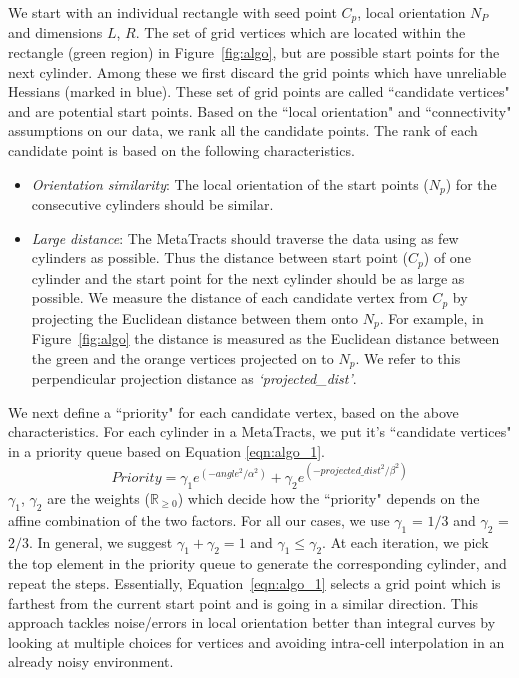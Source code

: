We start with an individual rectangle with seed point $C_{p}$, local orientation $N_P$ and dimensions $L$, $R$. The set of grid vertices which are located within the rectangle (green region) in Figure~\ref{fig:algo}, but are possible start points for the next cylinder. Among these we first discard the grid points which have unreliable Hessians (marked in blue). These set of grid points are called ``candidate vertices" and are potential start points. Based on the ``local orientation" and ``connectivity" assumptions on our data, we rank all the candidate points. The rank of each candidate point is based on the following characteristics.
\begin{itemize}[noitemsep,nolistsep]
\item \textit{Orientation similarity}: The local orientation of the start points ($N_p$) for the consecutive cylinders should be similar. 
\item \textit{Large distance}: The MetaTracts should traverse the data using as few cylinders as possible. Thus the distance between start point ($C_p$) of one cylinder and the start point for the next cylinder should be as large as possible. We measure the distance of each candidate vertex from $C_p$ by projecting the Euclidean distance between them onto $N_p$. For example, in Figure~\ref{fig:algo} the distance is measured as the Euclidean distance between the green and the orange vertices projected on to $N_p$. We refer to this perpendicular projection distance as \textit{`projected\_dist'}. 
\end{itemize}

We next define a ``priority" for each candidate vertex, based on the above characteristics. For each cylinder in a MetaTracts, we put it's ``candidate vertices" in a priority queue based on Equation \ref{eqn:algo_1}.
\begin{equation}
Priority = \gamma_1 e^{(-angle^2 / \alpha^2)} + \gamma_2e^{(-projected\_dist^2 / \beta^2)}
\label{eqn:algo_1}
\end{equation}
$\gamma_1$, $\gamma_2$ are the  weights ($\mathbb{R}_{\ge 0}$)  which decide how the ``priority" depends on the affine combination of the two factors. For all our cases, we use $\gamma_1$ = $1 / 3 $ and $\gamma_2$ = $2 / 3$. In general, we suggest $\gamma_1 +\gamma_2 = 1 $ and $\gamma_1 \leq \gamma_2$. At each iteration, we pick the top element in the priority queue to generate the corresponding cylinder, and repeat the steps. Essentially, Equation~\ref{eqn:algo_1} selects a grid point which is farthest from the current start point and is going in a similar direction. This approach tackles noise/errors in local orientation better than integral curves by looking at multiple choices for vertices and avoiding intra-cell interpolation in an already noisy environment. 

